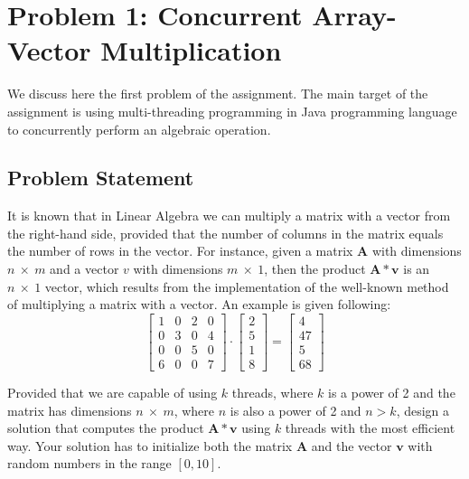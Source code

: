 \documentclass[acmlarge]{acmart}
\begin{document}
\section{Problem 1: Concurrent Array-Vector Multiplication}
\label{section:problem1}
We discuss here the first problem of the assignment. The main target of the assignment is using multi-threading programming in Java programming language to concurrently perform an algebraic operation.
\subsection{Problem Statement}
It is known that in Linear Algebra we can multiply a matrix with a vector from the right-hand side, provided that the number of columns in the matrix equals the number of rows in the vector. For instance, given a matrix $\mathbf{A}$ with dimensions $n~\times~m$ and a vector $v$ with dimensions $m~\times~1$, then the product $\mathbf{A}*\mathbf{v}$ is an $n~\times~1$ vector, which results from the implementation of the well-known method of multiplying a matrix with a vector. An example is given following:
\begin{displaymath}
  \begin{bmatrix}
    1 & 0 & 2 & 0 \\
    0 & 3 & 0 & 4 \\
    0 & 0 & 5 & 0 \\
    6 & 0 & 0 & 7
  \end{bmatrix}
  \cdot
  \begin{bmatrix}
    2 \\
    5 \\
    1 \\
    8
  \end{bmatrix}
  =
  \begin{bmatrix}
    4  \\
    47 \\
    5  \\
    68
  \end{bmatrix}
\end{displaymath}

Provided that we are capable of using $k$ threads, where $k$ is a power of 2 and the matrix has dimensions $n~\times~m$, where $n$ is also a power of 2 and $n>k$, design a solution that computes the product $\mathbf{A}*\mathbf{v}$ using $k$ threads with the most efficient way. Your solution has to initialize both the matrix $\mathbf{A}$ and the vector $\mathbf{v}$ with random numbers in the range $[0, 10]$.
\end{document}
